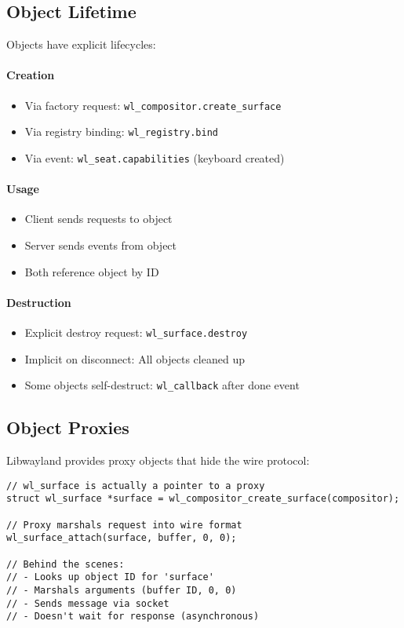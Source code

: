 \subsection{Object Lifetime}

Objects have explicit lifecycles:

\paragraph{Creation}
\begin{itemize}
    \item Via factory request: \texttt{wl\_compositor.create\_surface}
    \item Via registry binding: \texttt{wl\_registry.bind}
    \item Via event: \texttt{wl\_seat.capabilities} (keyboard created)
\end{itemize}

\paragraph{Usage}
\begin{itemize}
    \item Client sends requests to object
    \item Server sends events from object
    \item Both reference object by ID
\end{itemize}

\paragraph{Destruction}
\begin{itemize}
    \item Explicit destroy request: \texttt{wl\_surface.destroy}
    \item Implicit on disconnect: All objects cleaned up
    \item Some objects self-destruct: \texttt{wl\_callback} after done event
\end{itemize}

\subsection{Object Proxies}

Libwayland provides proxy objects that hide the wire protocol:

\begin{lstlisting}[style=cstyle, caption=Proxies Hide Protocol Details]
// wl_surface is actually a pointer to a proxy
struct wl_surface *surface = wl_compositor_create_surface(compositor);

// Proxy marshals request into wire format
wl_surface_attach(surface, buffer, 0, 0);

// Behind the scenes:
// - Looks up object ID for 'surface'
// - Marshals arguments (buffer ID, 0, 0)
// - Sends message via socket
// - Doesn't wait for response (asynchronous)
\end{lstlisting}

